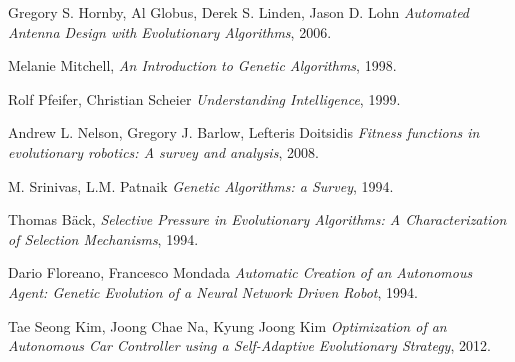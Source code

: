 \documentclass[a4paper,12pt]{article}
\begin{document}
\newpage
\begin{thebibliography}{1}
	 Gregory S. Hornby, Al Globus, Derek S. Linden, Jason D. Lohn \emph{Automated Antenna Design with Evolutionary Algorithms}, 2006.
	
	 Melanie Mitchell, \emph{An Introduction to Genetic Algorithms}, 1998.
	
	 Rolf Pfeifer, Christian Scheier \emph{Understanding Intelligence}, 1999.
	
	 Andrew L. Nelson, Gregory J. Barlow, Lefteris Doitsidis \emph{Fitness functions in evolutionary robotics: A survey and analysis}, 2008.
	
	 M. Srinivas, L.M. Patnaik \emph{Genetic Algorithms: a Survey}, 1994.
	
	 Thomas B\"{a}ck, \emph{Selective Pressure in Evolutionary Algorithms: A Characterization of Selection Mechanisms}, 1994.
	
	
	
	 Dario Floreano, Francesco Mondada \emph{Automatic Creation of an Autonomous Agent: Genetic Evolution of a Neural Network Driven Robot}, 1994.
	
	 Tae Seong Kim, Joong Chae Na, Kyung Joong Kim \emph{Optimization of an Autonomous Car Controller using a Self-Adaptive Evolutionary Strategy}, 2012.
	
	

\end{thebibliography}
\end{document}
